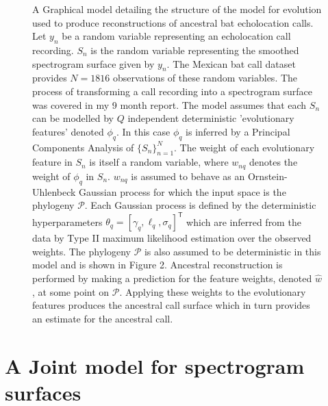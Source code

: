 \documentclass[]{article}
\begin{document}
\begin{figure}
\caption{A Graphical model detailing the structure of the model for evolution used to produce reconstructions of ancestral bat echolocation calls. Let \(y_n\) be a random variable representing an echolocation call recording. \(S_n\) is the random variable representing the smoothed spectrogram surface given by \(y_n\). The Mexican bat call dataset provides \(N = 1816\) observations of these random variables. The process of transforming a call recording into a spectrogram surface was covered in my 9 month report. The model assumes that each \(S_n\) can be modelled by \(Q\) independent deterministic 'evolutionary features' denoted \(\phi_q\). In this case \(\phi_q\) is inferred by a Principal Components Analysis of \(\{S_n\}_{n = 1}^N\). The weight of each evolutionary feature in \(S_n\) is itself a random variable, where \(w_{nq}\) denotes the weight of \(\phi_q\) in \(S_n\). \(w_{nq}\) is assumed to behave as an Ornstein-Uhlenbeck Gaussian process for which the input space is the phylogeny \(\mathcal{P}\). Each Gaussian process is defined by the deterministic hyperparameters \(\theta_q = [\gamma_q, \ell_q, \sigma_q]^\mathsf{T}\) which are inferred from the data by Type II maximum likelihood estimation over the observed weights. The phylogeny \(\mathcal{P}\) is also assumed to be deterministic in this model and is shown in Figure 2. Ancestral reconstruction is performed by making a prediction for the feature weights, denoted \(\hat{w}\), at some point on \(\mathcal{P}\). Applying these weights to the evolutionary features produces the ancestral call surface which in turn provides an estimate for the ancestral call.}
\end{figure}

\section{A Joint model for spectrogram
surfaces}\label{a-joint-model-for-spectrogram-surfaces}
\end{document}
